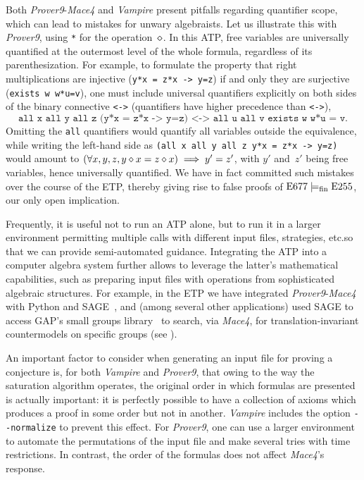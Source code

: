 Both \emph{Prover9}-\emph{Mace4} and \emph{Vampire} present pitfalls regarding quantifier scope, which can lead to mistakes for unwary algebraists.
Let us illustrate this with \emph{Prover9}, using \verb|*| for the operation~$\diamond$.  In this ATP, free variables are universally quantified at the outermost level of the whole formula, regardless of its parenthesization.
For example, to formulate the property that right multiplications are injective (\texttt{y*x = z*x -> y=z}) if and only they are surjective (\texttt{exists w w*u=v}), one must include universal quantifiers explicitly on both sides of the binary connective \texttt{<->} (quantifiers have higher precedence than \texttt{<->}),
\begin{equation*}
  \texttt{all x all y all z (y*x = z*x -> y=z) <-> all u all v exists w w*u = v.}
\end{equation*}
Omitting the \texttt{all} quantifiers would quantify all variables outside the equivalence, while writing the left-hand side as \texttt{(all x all y all z y*x = z*x -> y=z)} would amount to $(\forall x,y,z, y\diamond x=z\diamond x) \implies y'=z'$, with $y'$ and~$z'$ being free variables, hence universally quantified.
We have in fact committed such mistakes over the course of the ETP, thereby giving rise to false proofs of $\mathrm{E}677\models_{\mathrm{fin}}\mathrm{E}255$, our only open implication.

Frequently, it is useful not to run an ATP alone, but to run it in a larger environment permitting multiple calls with different input files, strategies, etc.\@ so that we can provide semi-automated guidance. Integrating the ATP into a computer algebra system further allows to leverage the latter's mathematical capabilities, such as preparing input files with operations from sophisticated algebraic structures. For example, in the ETP we have integrated \emph{Prover9}-\emph{Mace4} with Python and SAGE~\cite{sagemath}, and (among several other applications) used SAGE to access GAP's small groups library~\cite{GAP4,smallgrp} to search, via \emph{Mace4}, for translation-invariant countermodels on specific groups (see ).

An important factor to consider when generating an input file for proving a conjecture is, for both \emph{Vampire} and \emph{Prover9}, that owing to the way the saturation algorithm operates, the original order in which formulas are presented is actually important: it is perfectly possible to have a collection of axioms which produces a proof in some order but not in another. \emph{Vampire} includes the option \verb|--normalize| to prevent this effect. For \emph{Prover9}, one can use a larger environment to automate the permutations of the input file and make several tries with time restrictions. In contrast, the order of the formulas does not affect \emph{Mace4}'s response.

